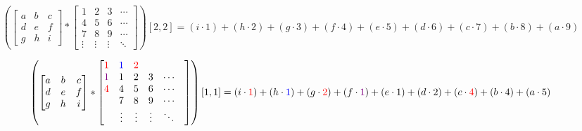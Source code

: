 \documentclass[a4paper,11pt]{article}
\theoremstyle{plain}
\begin{document}
$$\displaystyle \left({\begin{bmatrix}a&b&c\\d&e&f\\g&h&i\end{bmatrix}}*{\begin{bmatrix}
1&2&3&\cdots\\
4&5&6&\cdots\\
7&8&9&\cdots\\
\vdots&\vdots&\vdots&\ddots

\end{bmatrix}}\right)[2,2]=(i\cdot 1)+(h\cdot 2)+(g\cdot 3)+(f\cdot 4)+(e\cdot 5)+(d\cdot 6)+(c\cdot 7)+(b\cdot 8)+(a\cdot 9)$$


$$\displaystyle \left({\begin{bmatrix}a&b&c\\d&e&f\\g&h&i\end{bmatrix}}*{\begin{bmatrix}
\textcolor{red}{1}&\textcolor{blue}{1}&\textcolor{red}{2}&&&\\
\textcolor{violet}{1}&1&2&3&\cdots\\
\textcolor{red}{4}&4&5&6&\cdots\\
&7&8&9&\cdots\\
&\vdots&\vdots&\vdots&\ddots

\end{bmatrix}}\right)[1,1]=(i\cdot \textcolor{red}{1})+(h\cdot \textcolor{blue}{1})+(g\cdot \textcolor{red}{2})+(f\cdot \textcolor{violet}{1})+(e\cdot 1)+(d\cdot 2)+(c\cdot \textcolor{red}{4})+(b\cdot 4)+(a\cdot 5)$$
\end{document}
